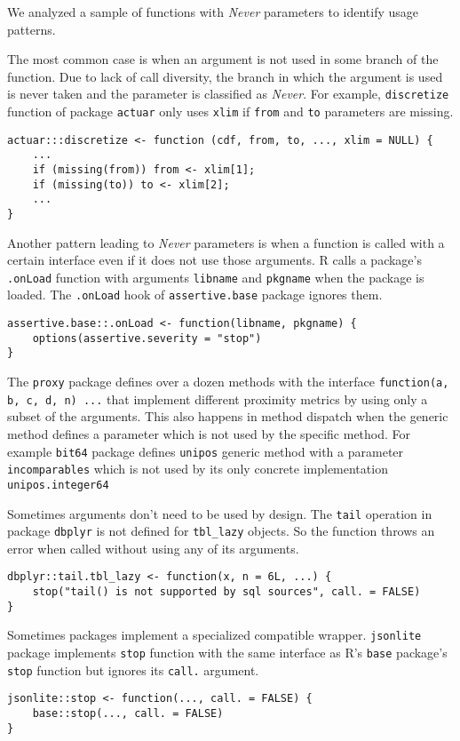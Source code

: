 \documentclass[review,nonacm,screen,acmsmall,anonymous=true]{acmart}
\newcommand{\never}{\emph{Never}\xspace}
\newcommand{\code}[1]{\lstinline[style=R]|#1|\xspace}
\begin{document}
We analyzed a sample of functions with \never parameters to identify usage
patterns.

The most common case is when an argument is not used in some branch of the
function. Due to lack of call diversity, the branch in which the argument is
used is never taken and the parameter is classified as \never. For example,
\code{discretize} function of package \code{actuar} only uses \code{xlim} if
\code{from} and \code{to} parameters are missing.
\begin{lstlisting}
actuar:::discretize <- function (cdf, from, to, ..., xlim = NULL) {
    ...
    if (missing(from)) from <- xlim[1];
    if (missing(to)) to <- xlim[2];
    ...
}
\end{lstlisting}


Another pattern leading to \never parameters is when a function is called with a
certain interface even if it does not use those arguments. R calls a package's
\code{.onLoad} function with arguments \code{libname} and \code{pkgname} when
the package is loaded. The \code{.onLoad} hook of \code{assertive.base} package
ignores them.
\begin{lstlisting}
assertive.base::.onLoad <- function(libname, pkgname) {
    options(assertive.severity = "stop")
}
\end{lstlisting}

The \code{proxy} package defines over a dozen methods with the interface
\code{function(a, b, c, d, n) ...} that implement different proximity metrics by
using only a subset of the arguments.
This also happens in method dispatch when the generic method defines a parameter
which is not used by the specific method. For example \code{bit64} package
defines \code{unipos} generic method with a parameter \code{incomparables} which
is not used by its only concrete implementation \code{unipos.integer64}


Sometimes arguments don't need to be used by design.
The \code{tail} operation in package \code{dbplyr} is not defined for
\code{tbl_lazy} objects. So the function throws an error when called without
using any of its arguments.
\begin{lstlisting}
dbplyr::tail.tbl_lazy <- function(x, n = 6L, ...) {
    stop("tail() is not supported by sql sources", call. = FALSE)
}
\end{lstlisting}

Sometimes packages implement a specialized compatible wrapper.
\code{jsonlite} package implements \code{stop} function with the same interface
as R's \code{base} package's \code{stop} function but ignores its \code{call.}
argument.
\begin{lstlisting}
jsonlite::stop <- function(..., call. = FALSE) {
    base::stop(..., call. = FALSE)
}
\end{lstlisting}
\end{document}
